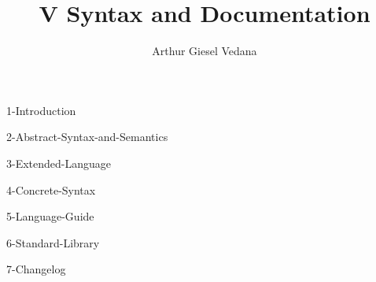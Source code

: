 \documentclass{article}
\author{Arthur Giesel Vedana}
\title{V Syntax and Documentation}
\begin{document}
\maketitle
\newpage

\tableofcontents
\newpage


{1-Introduction}
\newpage


{2-Abstract-Syntax-and-Semantics}
\newpage

{3-Extended-Language}
\newpage

{4-Concrete-Syntax}
\newpage

{5-Language-Guide}
\newpage

{6-Standard-Library}
\newpage

{7-Changelog}
\newpage
\end{document}
